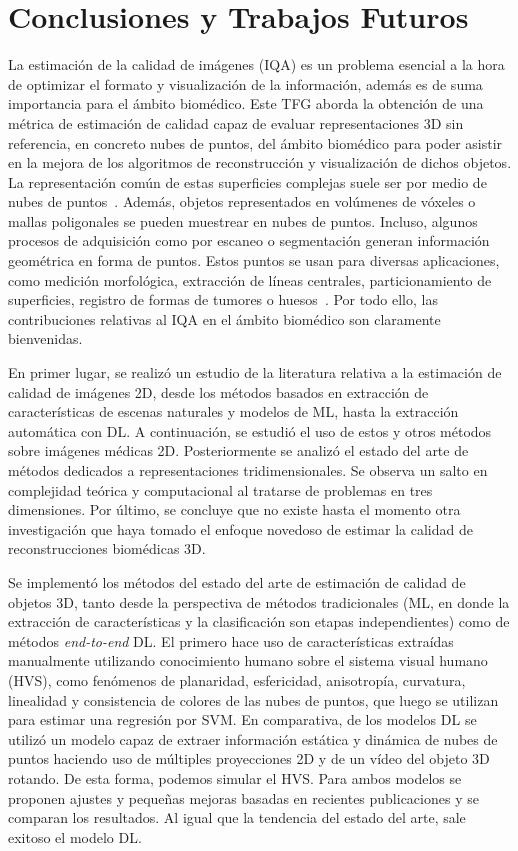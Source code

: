 \chapter{Conclusiones y Trabajos Futuros}
La estimación de la calidad de imágenes (IQA) es un problema esencial a la hora 
de optimizar el formato y visualización de la información, además es de 
suma importancia para el ámbito biomédico. 
Este TFG aborda la obtención de una métrica de estimación de calidad capaz de evaluar 
representaciones 3D sin referencia, en concreto nubes de puntos, del ámbito biomédico para poder asistir 
en la mejora de los algoritmos de reconstrucción y visualización de dichos objetos. 
La representación común de estas superficies complejas 
suele ser por medio de nubes de puntos~\cite{WhyUsePointCloud}. 
Además, objetos representados en volúmenes de vóxeles o mallas poligonales se pueden 
muestrear en nubes de puntos. Incluso, algunos procesos de adquisición como 
por escaneo o segmentación generan información geométrica en forma de puntos. 
Estos puntos se usan para diversas aplicaciones, 
como medición morfológica, extracción de líneas centrales, 
particionamiento de superficies, registro de formas de tumores o huesos~\cite{WhyUsePointCloud}.
Por todo ello, las contribuciones relativas al IQA en el 
ámbito biomédico son claramente bienvenidas.

En primer lugar, se realizó un estudio de la literatura relativa a la estimación de calidad 
de imágenes 2D, desde los métodos basados en extracción de características de escenas naturales y modelos de ML, 
hasta la extracción automática con DL. 
A continuación, se estudió el uso de estos y otros métodos sobre imágenes médicas 2D.
Posteriormente se analizó el estado del arte de métodos dedicados a representaciones tridimensionales. 
Se observa un salto en complejidad teórica y computacional al tratarse de problemas 
en tres dimensiones. 
Por último, se concluye que no existe hasta el momento 
otra investigación que haya tomado el enfoque novedoso de estimar la calidad de 
reconstrucciones biomédicas 3D. 

Se implementó los métodos del estado del arte de estimación de calidad de objetos 
3D, tanto desde la perspectiva de métodos tradicionales (ML, en donde la extracción 
de características y la clasificación son etapas independientes) como de métodos 
\emph{end-to-end} DL. El primero hace uso de características 
extraídas manualmente utilizando conocimiento humano sobre el sistema visual humano (HVS), 
como fenómenos de planaridad, esfericidad, anisotropía, curvatura, linealidad y consistencia de 
colores de las nubes de puntos, que luego se utilizan para estimar una regresión por 
SVM. En comparativa, de los modelos DL se utilizó un modelo capaz de extraer 
información estática y dinámica de nubes de puntos haciendo uso de múltiples 
proyecciones 2D y de un vídeo del objeto 3D rotando. De esta forma, podemos  
simular el HVS. Para ambos modelos se proponen ajustes y pequeñas mejoras basadas 
en recientes publicaciones y se comparan los resultados. 
Al igual que la tendencia del estado del arte, sale exitoso el modelo DL. 

